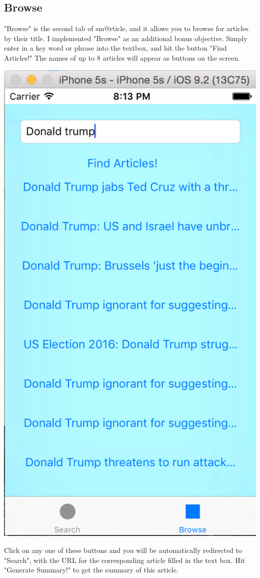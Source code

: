\documentclass[11pt, margin=1in]{article}
\begin{document}
\subsection{Browse}
"Browse" is the second tab of sm@rticle, and it allows you to browse for articles by their title.  I implemented "Browse" as an additional bonus objective. 
Simply enter in a key word or phrase into the textbox, and hit the button "Find Articles!"  The names of up to 8 articles will appear as buttons on the screen.  
\begin{center}
\includegraphics[scale=0.7]{6.jpg}
\end{center}
Click on any one of these buttons and you will be automatically redirected to "Search", with the URL for the corresponding article filled in the text box.  Hit "Generate Summary!" to get the summary of this article.  
\end{document}

